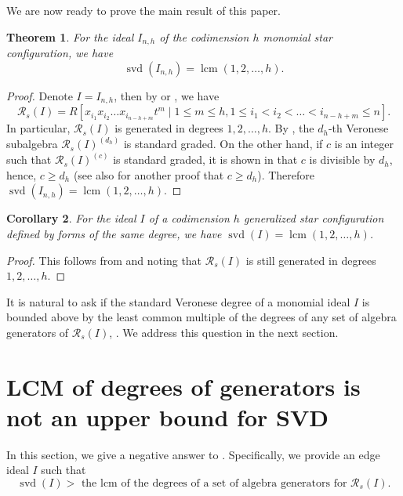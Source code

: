 \documentclass[12pt]{amsart}
\numberwithin{equation}{section}
\newtheorem{theorem}{Theorem}[section]
\newtheorem{corollary}[theorem]{Corollary}
\theoremstyle{definition}
\DeclareMathOperator{\lcm}{lcm}
\DeclareMathOperator{\svd}{svd}
\def\R{{\mathcal R}}
\def\R{{\mathcal R}}
\begin{document}
We are now ready to prove the main result of this paper.

\begin{theorem}
    \label{thm.Star}
    For the ideal $I_{n,h}$ of the codimension $h$ monomial star configuration, we have $$\svd(I_{n,h})=\lcm(1,2,\ldots ,h).$$
\end{theorem}
\begin{proof}
    Denote $I=I_{n,h}$, then by \cite[Proposition 4.6]{HHT2007} or \cite[Example 3.9]{symbolicReesSurvey}, we have
    $$\R_s(I) = R[x_{i_1}x_{i_2}\ldots x_{i_{n-h+m}}t^m \mid 1\le m \le h, 1\le i_1 < i_2 < \ldots < i_{n-h+m} \le n].$$
    In particular, $\R_s(I)$ is generated in degrees $1,2,\ldots ,h$. By , the $d_h$-th Veronese subalgebra $\R_s(I)^{(d_h)}$ is standard graded. On the other hand, if $c$ is an integer such that $\R_s(I)^{(c)}$ is standard graded, it is shown in \cite[Example 3.9]{symbolicReesSurvey} that $c$ is divisible by $d_h$, hence, $c\ge d_h$ (see also \cite[Example 6.7]{TaiThaiNOBody} for another proof that $c\ge d_h$). Therefore $\svd(I_{n,h})=\lcm(1,2,\ldots ,h).$
\end{proof}

\begin{corollary}
    \label{cor.genStar} For the ideal $I$ of a codimension $h$ generalized star configuration defined by forms of the same degree, we have $\svd(I)=\lcm(1,2,\ldots ,h)$. 
\end{corollary}

\begin{proof}
    This follows from  and \cite[Theorem 3.6]{GHMN17} noting that $\R_s(I)$ is still generated in degrees $1,2,\ldots,h$.
\end{proof}

It is natural to ask if the standard Veronese degree of a monomial ideal $I$ is bounded above by the least common multiple of the degrees of any set of algebra generators of $\R_s(I)$, \cite[Question 3.10]{symbolicReesSurvey}. We address this question in the next section.


\section{LCM of degrees of generators is not an upper bound for SVD}

In this section, we give a negative answer to \cite[Question 3.10]{symbolicReesSurvey}. Specifically, we provide an edge ideal $I$ such that 
\[
\svd(I) > \text{ the lcm of the degrees of a set of algebra generators for } \R_s(I).
\]
\end{document}
